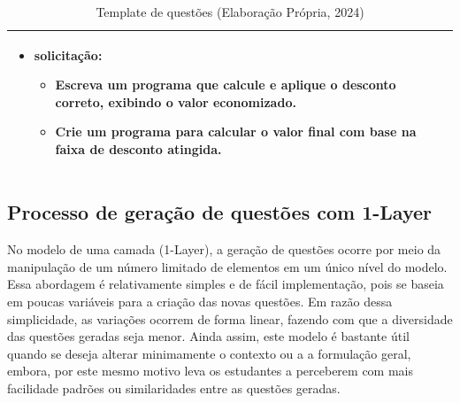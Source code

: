\begin{table}[htbp]
\begin{tabular}{|l|p{10cm}|}
\begin{itemize}[leftmargin=1em]
  \item \textbf{solicitação}:
    \begin{itemize}[leftmargin=1em]
      \item Escreva um programa que calcule e aplique o desconto correto, exibindo o valor economizado.
      \item Crie um programa para calcular o valor final com base na faixa de desconto atingida.
    \end{itemize}
\end{itemize}\\
\hline

\end{tabular}
\caption{Template de questões (Elaboração Própria, 2024)}
\label{tab:template-questoes-elementos}
\end{table}




\subsection{Processo de geração de questões com 1-Layer}

No modelo de uma camada (1-Layer), a geração de questões ocorre por meio da manipulação de um número limitado de elementos em um único nível do modelo. Essa abordagem é relativamente simples e de fácil implementação, pois se baseia em poucas variáveis para a criação das novas questões. Em razão dessa simplicidade, as variações ocorrem de forma linear, fazendo com que a diversidade das questões geradas seja menor. Ainda assim, este modelo é bastante útil quando se deseja alterar minimamente o contexto ou a a formulação geral, embora, por este mesmo motivo leva os estudantes a perceberem com mais facilidade padrões ou similaridades entre as questões geradas. 




